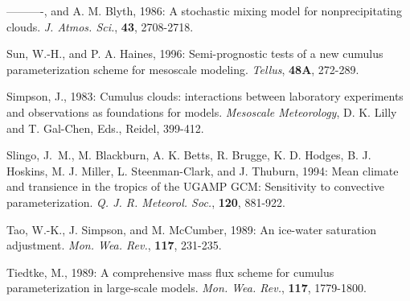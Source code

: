 \por
----------, and A. M. Blyth, 1986: A stochastic mixing model for
nonprecipitating clouds.
{\it J. Atmos. Sci.}, {\bf 43}, 2708-2718.


\por
Sun, W.-H., and P. A. Haines, 1996: Semi-prognostic tests of a new cumulus
parameterization scheme for mesoscale modeling.
{\it Tellus}, {\bf 48A}, 272-289.




\por
Simpson, J., 1983: Cumulus clouds: interactions between laboratory
experiments and observations as foundations for models.
{\it Mesoscale Meteorology}, D. K. Lilly and T. Gal-Chen, Eds., Reidel,
399-412.

\por
Slingo, J.~M., M. Blackburn, A. K. Betts, R. Brugge, K. D. Hodges,
B. J. Hoskins, M. J. Miller, L. Steenman-Clark, and J. Thuburn, 1994:
Mean climate and
transience in the tropics of the UGAMP GCM: Sensitivity to convective
parameterization. {\it Q. J. R. Meteorol. Soc.}, {\bf 120}, 881-922.


\por
Tao, W.-K., J. Simpson, and M. McCumber, 1989: An ice-water
saturation adjustment. {\it Mon. Wea. Rev.}, {\bf 117}, 231-235.

\por
Tiedtke, M., 1989: A comprehensive mass flux scheme for cumulus
parameterization in large-scale models.
{\it Mon. Wea. Rev.}, {\bf 117}, 1779-1800.

